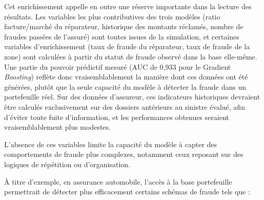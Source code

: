 Cet enrichissement appelle en outre une réserve importante dans la lecture des résultats. Les variables les plus contributives des trois modèles (ratio facture/marché du réparateur, historique des montants réclamés, nombre de fraudes passées de l'assuré) sont toutes issues de la simulation, et certaines variables d'enrichissement (taux de fraude du réparateur, taux de fraude de la zone) sont calculées à partir du statut de fraude observé dans la base elle-même. Une partie du pouvoir prédictif mesuré (AUC de 0,933 pour le Gradient \textit{Boosting}) reflète donc vraisemblablement la manière dont ces données ont été générées, plutôt que la seule capacité du modèle à détecter la fraude dans un portefeuille réel. Sur des données d'assureur, ces indicateurs historiques devraient être calculés exclusivement sur des dossiers antérieurs au sinistre évalué, afin d'éviter toute fuite d'information, et les performances obtenues seraient vraisemblablement plus modestes.

L'absence de ces variables limite la capacité du modèle à capter des comportements de fraude plus complexes, notamment ceux reposant sur des logiques de répétition ou d'organisation.

À titre d'exemple, en assurance automobile, l'accès à la base portefeuille permettrait de détecter plus efficacement certains schémas de fraude tels que :

